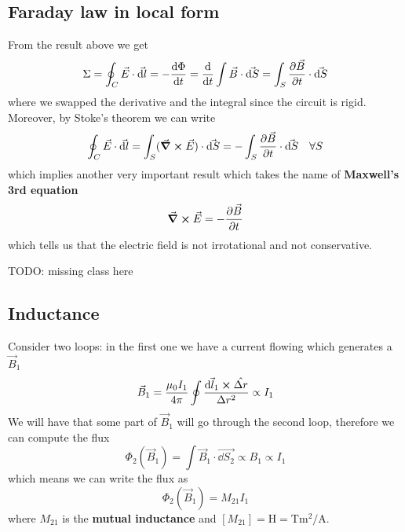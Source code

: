 \documentclass[12pt]{extarticle}
\begin{document}
\subsection{Faraday law in local form}

From the result above we get
\begin{equation}
    \Sigma = \oint_C \vec E \cdot \vec{\dd l } = - \dv{\Phi}{t} = \dv{t} \int \vec B \cdot \vec{\dd S} = \int_S \pdv{\vec B}{t} \cdot \vec{\dd S}
\end{equation}
where we swapped the derivative and the integral since the circuit is rigid.
Moreover, by Stoke's theorem we can write
\begin{equation}
    \oint_C \vec E \cdot \vec{\dd l} = \int_S (\curl \vec E) \cdot \vec {\dd{S}} = - \int_S\pdv{\vec B}{t} \cdot \vec{\dd S} \quad \forall S
\end{equation}
which implies another very important result which takes the name of \textbf{Maxwell's 3rd equation}
\begin{equation}
    \curl \vec E = - \pdv{\vec B}{t}
\end{equation}
which tells us that the electric field is not irrotational and not conservative.

TODO: missing class here

\subsection{Inductance}

Consider two loops: in the first one we have a current flowing which generates a $\vec B_1$
\begin{equation}
    \vec B_1 = \frac{\mu_0 I_1}{4 \pi} \oint \frac{\vec{\dd l_1} \cross \hat{\Delta r}}{\Delta r^2} \propto I_1
\end{equation}
We will have that some part of $\vec B_1$ will go through the second loop, therefore we can compute the flux
\begin{equation}
    \Phi_2(\vec B_1) = \int \vec B_1 \cdot \vec{\dd S_2} \propto B_1 \propto I_1
\end{equation}
which means we can write the flux as
\begin{equation}
    \Phi_2(\vec B_1) = M_{21} I_1
\end{equation}
where $M_{21}$ is the \textbf{mutual inductance} and $[M_{21}] = \si{\henry} = \si{\tesla \meter \squared \per \ampere}$.
\end{document}
